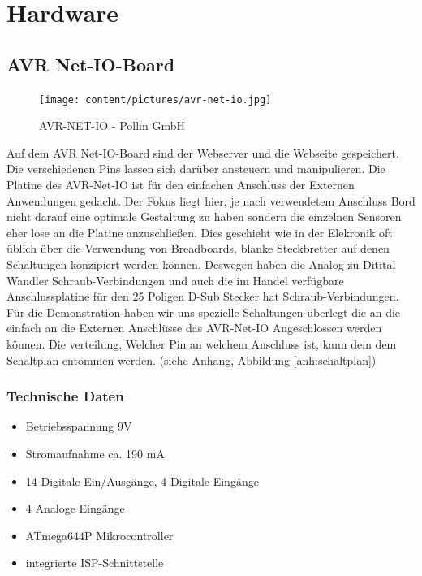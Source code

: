 \chapter{Hardware}
\section{AVR Net-IO-Board}
\begin{figure}[h]
\centering
\texttt{[image: content/pictures/avr-net-io.jpg]}
\caption{AVR-NET-IO - Pollin GmbH}
\label{fig:B3}
\end{figure}

Auf dem AVR Net-IO-Board sind der Webserver und die Webseite gespeichert. Die
verschiedenen Pins lassen sich darüber ansteuern und manipulieren.
Die Platine des AVR-Net-IO ist für den einfachen Anschluss der Externen
Anwendungen gedacht. Der Fokus liegt hier, je nach verwendetem Anschluss Bord
nicht darauf eine optimale Gestaltung zu haben sondern die einzelnen Sensoren
eher lose an die Platine anzuschließen. Dies geschieht wie in der Elekronik oft
üblich über die Verwendung von Breadboards, blanke Steckbretter auf
denen Schaltungen konzipiert werden können. Deswegen haben die Analog zu Ditital
Wandler Schraub-Verbindungen und auch die im Handel verfügbare Anschlussplatine
für den 25 Poligen D-Sub Stecker hat Schraub-Verbindungen. Für die Demonstration
haben wir uns spezielle Schaltungen überlegt die an die einfach an die Externen
Anschlüsse das AVR-Net-IO Angeschlossen werden können. Die verteilung, Welcher
Pin an welchem Anschluss ist, kann dem dem Schaltplan entommen werden. (siehe
Anhang, Abbildung \ref{anh:schaltplan})

\subsection{Technische Daten}
\begin{itemize}
  \item Betriebsspannung 9V 
  \item Stromaufnahme ca. 190 mA
  \item 14 Digitale Ein/Ausgänge, 4 Digitale Eingänge
  \item 4 Analoge Eingänge
  \item ATmega644P Mikrocontroller
  \item integrierte ISP-Schnittstelle
\end{itemize}

